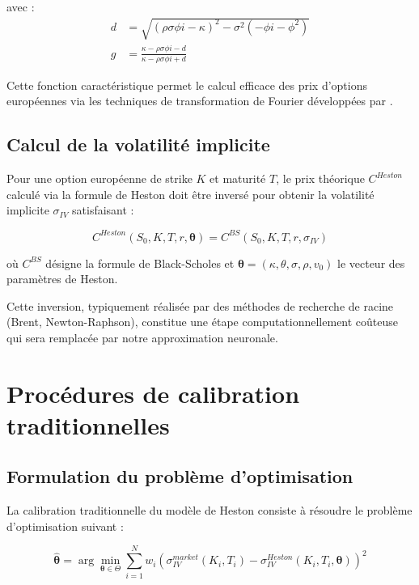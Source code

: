 avec :
\begin{align}
d &= \sqrt{(\rho\sigma\phi i - \kappa)^2 - \sigma^2(-\phi i - \phi^2)}\\
g &= \frac{\kappa - \rho\sigma\phi i - d}{\kappa - \rho\sigma\phi i + d}
\end{align}

Cette fonction caractéristique permet le calcul efficace des prix d'options européennes via les techniques de transformation de Fourier développées par \citet{carr1999option}.

\subsection{Calcul de la volatilité implicite}

Pour une option européenne de strike $K$ et maturité $T$, le prix théorique $C^{Heston}$ calculé via la formule de Heston doit être inversé pour obtenir la volatilité implicite $\sigma_{IV}$ satisfaisant :

\begin{equation}
C^{Heston}(S_0, K, T, r, \boldsymbol{\theta}) = C^{BS}(S_0, K, T, r, \sigma_{IV})
\end{equation}

où $C^{BS}$ désigne la formule de Black-Scholes et $\boldsymbol{\theta} = (\kappa, \theta, \sigma, \rho, v_0)$ le vecteur des paramètres de Heston.

Cette inversion, typiquement réalisée par des méthodes de recherche de racine (Brent, Newton-Raphson), constitue une étape computationnellement coûteuse qui sera remplacée par notre approximation neuronale.

\section{Procédures de calibration traditionnelles}

\subsection{Formulation du problème d'optimisation}

La calibration traditionnelle du modèle de Heston consiste à résoudre le problème d'optimisation suivant :

\begin{equation}
\hat{\boldsymbol{\theta}} = \arg\min_{\boldsymbol{\theta} \in \Theta} \sum_{i=1}^{N} w_i \left(\sigma_{IV}^{market}(K_i, T_i) - \sigma_{IV}^{Heston}(K_i, T_i, \boldsymbol{\theta})\right)^2 \label{eq:calibration_objective}
\end{equation}

